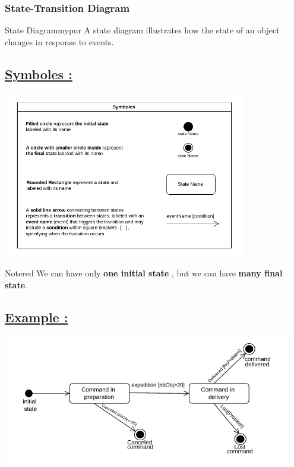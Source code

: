 \vspace{1cm}
\subsubsection{State-Transition Diagram}

\begin{prettyBox}{State Diagram}{mypur}
A state diagram illustrates how the state of an object changes in response to events.
\end{prettyBox}

\subsection*{\underline{Symboles :}}

\begin{center}
\includegraphics[width=0.8\textwidth]{Chapters/Diagram/ST/sym.drawio.pdf}
\end{center}

\vspace{0.25cm}

\begin{prettyBox}{Note}{red}
We can have only \textbf{one initial state} , but we can have \textbf{many final state}.
\end{prettyBox}

\subsection*{\underline{Example :}}

\begin{center}
\includegraphics[width=0.95\textwidth]{Chapters/Diagram/ST/state.drawio.pdf}
\end{center}


